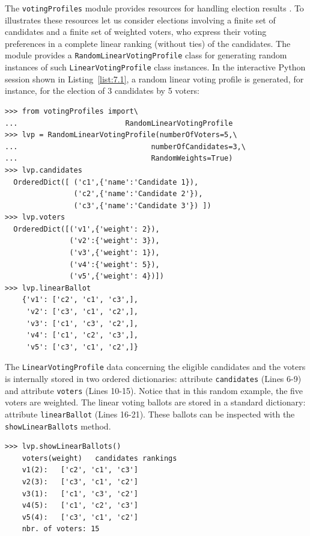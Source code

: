 The \texttt{votingProfiles} module provides resources for handling election results \citep{ADT-L2}. To illustrates these resources let us consider elections involving a finite set of candidates and a finite set of weighted voters, who express their voting preferences in a complete linear ranking (without ties) of the candidates. The module provides a \texttt{RandomLinearVotingProfile} class  for generating random instances of such \texttt{LinearVotingProfile} class instances. In the interactive Python session shown in Listing~\vref{list:7.1}, a random linear voting profile is generated, for instance, for the election of 3 candidates by 5 voters:
\begin{lstlisting}[caption={Example of random linear voting profile},label=list:7.1]
>>> from votingProfiles import\
...                         RandomLinearVotingProfile
>>> lvp = RandomLinearVotingProfile(numberOfVoters=5,\
...                               numberOfCandidates=3,\
...                               RandomWeights=True) 
>>> lvp.candidates
  OrderedDict([ ('c1',{'name':'Candidate 1}),
                ('c2',{'name':'Candidate 2'}),
                ('c3',{'name':'Candidate 3'}) ])
>>> lvp.voters
  OrderedDict([('v1',{'weight': 2}),
               ('v2':{'weight': 3}), 
               ('v3',{'weight': 1}),
               ('v4':{'weight': 5}),
               ('v5',{'weight': 4})])
>>> lvp.linearBallot
    {'v1': ['c2', 'c1', 'c3',],
     'v2': ['c3', 'c1', 'c2',],
     'v3': ['c1', 'c3', 'c2',],
     'v4': ['c1', 'c2', 'c3',],
     'v5': ['c3', 'c1', 'c2',]} 
 \end{lstlisting}

The \texttt{LinearVotingProfile} data concerning the eligible candidates and the voters is internally stored in two ordered dictionaries: attribute \texttt{candidates} (Lines 6-9) and attribute \texttt{voters} (Lines 10-15). Notice that in this random example, the five voters are weighted. The linear voting ballots are stored in a standard dictionary: attribute \texttt{linearBallot} (Lines 16-21). These ballots can be inspected with the \texttt{showLinearBallots} method.
\begin{lstlisting}
>>> lvp.showLinearBallots()
    voters(weight)	 candidates rankings
    v1(2): 	 ['c2', 'c1', 'c3']
    v2(3): 	 ['c3', 'c1', 'c2']
    v3(1): 	 ['c1', 'c3', 'c2']
    v4(5): 	 ['c1', 'c2', 'c3']
    v5(4): 	 ['c3', 'c1', 'c2']
    nbr. of voters: 15
\end{lstlisting}

